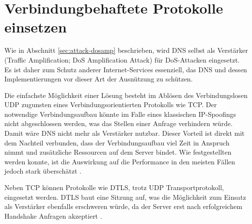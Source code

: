 \section{Verbindungbehaftete Protokolle einsetzen}
\label{sec:goals-trafficamp}
Wie in Abschnitt \ref{sec:attack-dosamp} beschrieben, wird DNS selbst als Verstärker (Traffic Amplification; DoS Amplification Attack) für DoS-Attacken eingesetzt. Es ist daher zum Schutz anderer Internet-Services essenziell, das DNS und dessen Implementierungen vor dieser Art der Ausnützung zu schützen.

Die einfachste Möglichkeit einer Lösung besteht im Ablösen des Verbindungslosen UDP zugunsten eines Verbindungsorientierten Protokolls wie TCP. Der notwendige Verbindungsaufbau könnte im Falle eines klassischen IP-Spoofings nicht abgeschlossen werden, was das Stellen einer Anfrage verhindern würde. Damit wäre DNS nicht mehr als Verstärker nutzbar. Dieser Vorteil ist direkt mit dem Nachteil verbunden, dass der Verbindungsaufbau viel Zeit in Anspruch nimmt und zusätzliche Ressourcen auf dem Server bindet. Wie festgestellten werden konnte, ist die Auswirkung auf die Performance in den meisten Fällen jedoch stark überschätzt \cite{Zhu2015}.

Neben TCP können Protokolle wie DTLS, trotz UDP Transportprotokoll, eingesetzt werden. DTLS baut eine Sitzung auf, was die Möglichkeit zum Einsatz als Verstärker ebenfalls erschweren würde, da der Server erst nach erfolgreichem Handshake Anfragen akzeptiert \cite{rfc6347}. 
